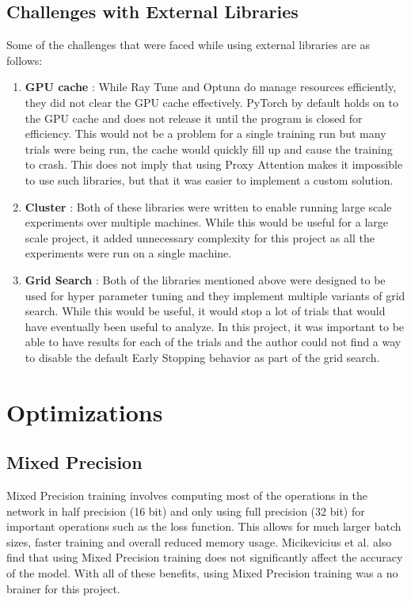 \subsection{Challenges with External Libraries} \label{sec:challenges_with_external_libraries}
Some of the challenges that were faced while using external libraries are as follows:
\begin{enumerate}
    \item \textbf{GPU cache} : While Ray Tune and Optuna do manage resources efficiently, they did not clear the GPU cache effectively. PyTorch by default holds on to the GPU cache and does not release it until the program is closed for efficiency. This would not be a problem for a single training run but many trials were being run, the cache would quickly fill up and cause the training to crash. This does not imply that using Proxy Attention makes it impossible to use such libraries, but that it was easier to implement a custom solution.
    \item \textbf{Cluster} : Both of these libraries were written to enable running large scale experiments over multiple machines. While this would be useful for a large scale project, it added unnecessary complexity for this project as all the experiments were run on a single machine.
    \item \textbf{Grid Search} : Both of the libraries mentioned above were designed to be used for hyper parameter tuning and they implement multiple variants of grid search. While this would be useful, it would stop a lot of trials that would have eventually been useful to analyze. In this project, it was important to be able to have results for each of the trials and the author could not find a way to disable the default Early Stopping behavior as part of the grid search.
\end{enumerate}

\section{Optimizations}
\subsection{Mixed Precision}
Mixed Precision training \cite{micikeviciusMixedPrecisionTraining2017} involves computing most of the operations in the network in half precision (16 bit) and only using full precision (32 bit) for important operations such as the loss function. This allows for much larger batch sizes, faster training and overall reduced memory usage. Micikevicius et al. also find that using Mixed Precision training does not significantly affect the accuracy of the model. With all of these benefits, using Mixed Precision training was a no brainer for this project.

